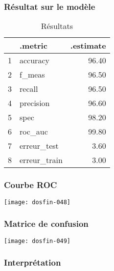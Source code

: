 \documentclass[a4paper,11pt]{article}
\begin{document}
\newpage

\subsubsection{Résultat sur le modèle}

\begin{center}


\begin{table}[ht]
\centering
\begin{tabular}{rlr}
  \hline
 & .metric & .estimate \\ 
  \hline
1 & accuracy & 96.40 \\ 
  2 & f\_meas & 96.50 \\ 
  3 & recall & 96.50 \\ 
  4 & precision & 96.60 \\ 
  5 & spec & 98.20 \\ 
  6 & roc\_auc & 99.80 \\ 
  7 & erreur\_test & 3.60 \\ 
  8 & erreur\_train & 3.00 \\ 
   \hline
\end{tabular}
\caption{Résultats} 
\end{table}
\end{center}

\subsubsection{Courbe ROC}

\begin{center}

\texttt{[image: dosfin-048]}

\end{center}

\subsubsection{Matrice de confusion}

\begin{center}

\texttt{[image: dosfin-049]}

\end{center}

\subsubsection{Interprétation}
\end{document}
